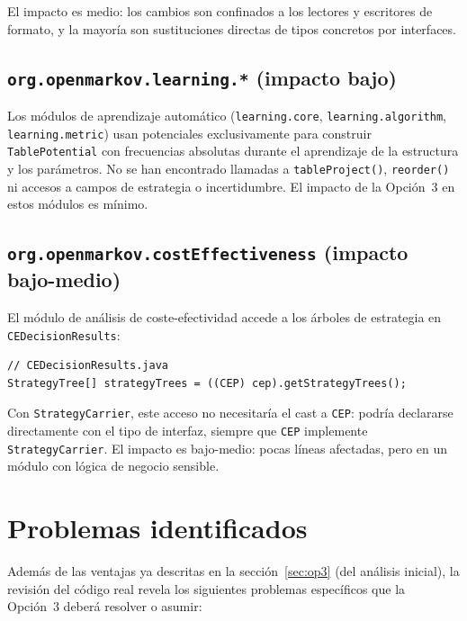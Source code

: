 \documentclass[11pt,a4paper]{article}
\newcommand{\code}[1]{\texttt{#1}}
\begin{document}
El impacto es medio: los cambios son confinados a los lectores y escritores de
formato, y la mayoría son sustituciones directas de tipos concretos por
interfaces.

\subsection{\code{org.openmarkov.learning.*} (impacto bajo)}
\label{sec:op3-learning}

Los módulos de aprendizaje automático (\code{learning.core},
\code{learning.algorithm}, \code{learning.metric}) usan potenciales
exclusivamente para construir \code{TablePotential} con frecuencias absolutas
durante el aprendizaje de la estructura y los parámetros.  No se han encontrado
llamadas a \code{tableProject()}, \code{reorder()} ni accesos a campos de
estrategia o incertidumbre.  El impacto de la Opción~3 en estos módulos es
mínimo.

\subsection{\code{org.openmarkov.costEffectiveness} (impacto bajo-medio)}
\label{sec:op3-ce}

El módulo de análisis de coste-efectividad accede a los árboles de
estrategia en \code{CEDecisionResults}:

\begin{lstlisting}[caption={Acceso a \code{strategyTrees} en el módulo de coste-efectividad}]
// CEDecisionResults.java
StrategyTree[] strategyTrees = ((CEP) cep).getStrategyTrees();
\end{lstlisting}

Con \code{StrategyCarrier}, este acceso no necesitaría el cast a \code{CEP}:
podría declararse directamente con el tipo de interfaz, siempre que \code{CEP}
implemente \code{StrategyCarrier}.  El impacto es bajo-medio: pocas líneas
afectadas, pero en un módulo con lógica de negocio sensible.

\section{Problemas identificados}
\label{sec:op3-problemas}

Además de las ventajas ya descritas en la sección~\ref{sec:op3} (del análisis
inicial), la revisión del código real revela los siguientes problemas
específicos que la Opción~3 deberá resolver o asumir:
\end{document}
